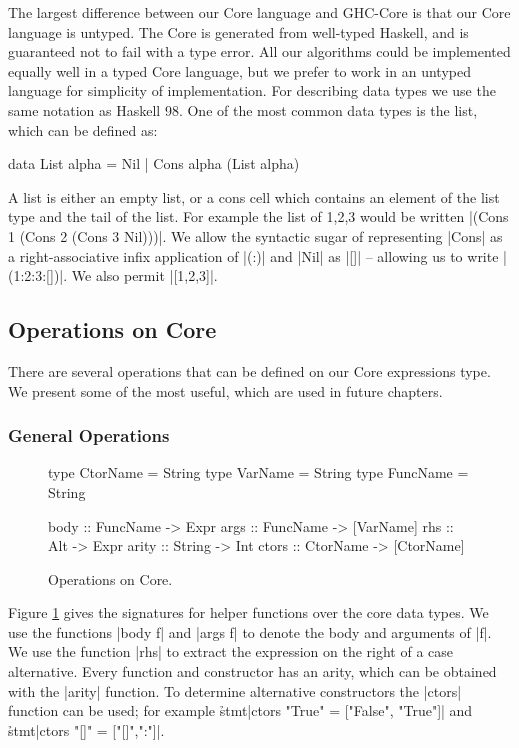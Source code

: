 The largest difference between our Core language and GHC-Core \cite{ghc_core} is that our Core language is untyped. The Core is generated from well-typed Haskell, and is guaranteed not to fail with a type error. All our algorithms could be implemented equally well in a typed Core language, but we prefer to work in an untyped language for simplicity of implementation. For describing data types we use the same notation as Haskell 98. One of the most common data types is the list, which can be defined as:

\begin{code}
data List alpha = Nil | Cons alpha (List alpha)
\end{code}

A list is either an empty list, or a cons cell which contains an element of the list type and the tail of the list. For example the list of 1,2,3 would be written |(Cons 1 (Cons 2 (Cons 3 Nil)))|. We allow the syntactic sugar of representing |Cons| as a right-associative infix application of |(:)| and |Nil| as |[]| -- allowing us to write |(1:2:3:[])|. We also permit |[1,2,3]|.


\subsection{Operations on Core}

There are several operations that can be defined on our Core expressions type. We present some of the most useful, which are used in future chapters.

\subsubsection{General Operations}

\begin{figure}
\begin{code}
type CtorName  = String
type VarName   = String
type FuncName  = String

body   :: FuncName  -> Expr
args   :: FuncName  -> [VarName]
rhs    :: Alt       -> Expr
arity  :: String    -> Int
ctors  :: CtorName  -> [CtorName]
\end{code}
\caption{Operations on Core.}
\label{figB:core_operations}
\end{figure}

Figure \ref{figB:core_operations} gives the signatures for helper functions over the core data types. We use the functions |body f| and |args f| to denote the body and arguments of |f|. We use the function |rhs| to extract the expression on the right of a case alternative. Every function and constructor has an arity, which can be obtained with the |arity| function. To determine alternative constructors the |ctors| function can be used; for example \h{stmt}|ctors "True" = ["False", "True"]| and \h{stmt}|ctors "[]" = ["[]",":"]|.


